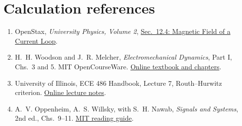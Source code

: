\documentclass[11pt,letterpaper]{article}
\begin{document}
\section*{Calculation references}
\begin{enumerate}
\raggedright
\item OpenStax, \emph{University Physics, Volume 2},
\href{https://openstax.org/books/university-physics-volume-2/pages/12-4-magnetic-field-of-a-current-loop}{Sec.~12.4: Magnetic Field of a Current Loop}.
\item H.~H. Woodson and J.~R. Melcher, \emph{Electromechanical Dynamics},
Part I, Chs.~3 and 5. MIT OpenCourseWare.
\href{https://ocw.mit.edu/courses/res-6-003-electromechanical-dynamics-spring-2009/pages/part-i/}{Online textbook and chapters}.
\item University of Illinois, ECE 486 Handbook, Lecture 7, Routh--Hurwitz criterion.
\href{https://courses.physics.illinois.edu/ece486/sp2026/documentation/handbook/lec07.html}{Online lecture notes}.
\item A.~V. Oppenheim, A.~S. Willsky, with S.~H. Nawab,
\emph{Signals and Systems}, 2nd ed., Chs.~9--11.
\href{https://ocw.mit.edu/courses/6-003-signals-and-systems-fall-2011/pages/readings/}{MIT reading guide}.
\end{enumerate}
\end{document}
